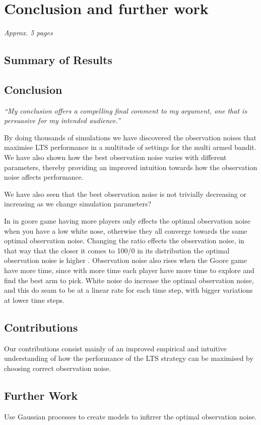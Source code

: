 \chapter{Conclusion and further work}
\label{ch:conclusion}
\textit{Approx. 5 pages}

\section{Summary of Results}

\section{Conclusion}
\emph{“My conclusion offers a compelling final comment to my argument, one that is persuasive for my intended audience.”}

By doing thousands of simulations we have discovered the observation noises that maximise LTS performance in a multitude of settings for the multi armed bandit.
We have also shown how the best observation noise varies with different parameters, thereby providing an improved intuition towards how the observation noise affects performance.

We have also seen that the best observation noise is not trivially decreasing or increasing as we change simulation parameters?

In in goore game having more players only effects the optimal observation noise when you have a low white nose,
otherwise they all converge towards the same optimal observation noise. Changing the ratio effects the observation
noise, in that way that the closer it comes to 100/0 in its distribution the optimal observation noise is higher .
Observation noise also rises when the Goore game have more time, since with more time each player have more time to explore
and find the best arm to pick. White noise do increase the optimal observation noise, and this do seam to be at a
linear rate for each time step, with bigger variations at lower time steps.

\section{Contributions}
Our contributions consist mainly of an improved empirical and intuitive understanding of how the performance of the LTS strategy can be maximised by choosing correct observation noise.


\section{Further Work}
Use Gaussian processes to create models to infirrer the optimal observation noise.

